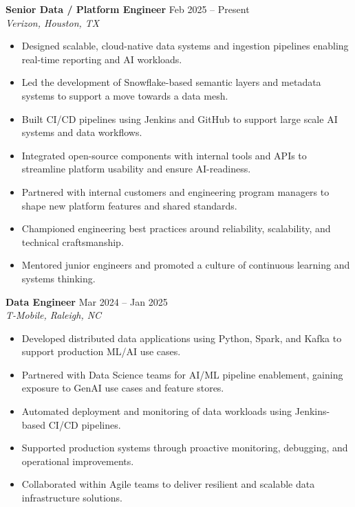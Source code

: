 \documentclass[10pt]{article}
\begin{document}
\textbf{Senior Data / Platform Engineer} \hfill Feb 2025 -- Present \\
\textit{Verizon, Houston, TX}
\begin{itemize}[leftmargin=*, itemsep=3pt]
    \item Designed scalable, cloud-native data systems and ingestion pipelines enabling real-time reporting and AI workloads.
    \item Led the development of Snowflake-based semantic layers and metadata systems to support a move towards a data mesh.
    \item Built CI/CD pipelines using Jenkins and GitHub to support large scale AI systems and data workflows.
    \item Integrated open-source components with internal tools and APIs to streamline platform usability and ensure AI-readiness.
    \item Partnered with internal customers and engineering program managers to shape new platform features and shared standards.
    \item Championed engineering best practices around reliability, scalability, and technical craftsmanship.
    \item Mentored junior engineers and promoted a culture of continuous learning and systems thinking.
\end{itemize}

\textbf{Data Engineer} \hfill Mar 2024 -- Jan 2025 \\
\textit{T-Mobile, Raleigh, NC}
\begin{itemize}[leftmargin=*, itemsep=3pt]
    \item Developed distributed data applications using Python, Spark, and Kafka to support production ML/AI use cases.
    \item Partnered with Data Science teams for AI/ML pipeline enablement, gaining exposure to GenAI use cases and feature stores.
    \item Automated deployment and monitoring of data workloads using Jenkins-based CI/CD pipelines.
    \item Supported production systems through proactive monitoring, debugging, and operational improvements.
    \item Collaborated within Agile teams to deliver resilient and scalable data infrastructure solutions.
\end{itemize}
\end{document}
